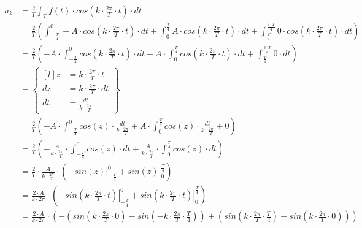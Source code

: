 \begin{equation}
\begin{aligned}
a_k&=\frac{2}{T}\int_{T}f(t) \cdot cos\left( k \cdot \frac{2\pi}{T} \cdot t\right) \cdot dt\\
&=\frac{2}{T}\left(\int_{-\frac{T}{4}}^{0} -A \cdot cos\left( k \cdot \frac{2\pi}{T} \cdot t\right) \cdot dt 
+ \int_{0}^{\frac{T}{4}} A \cdot cos\left( k \cdot \frac{2\pi}{T} \cdot t\right) \cdot dt
+ \int_{\frac{T}{4}}^{\frac{3\cdot T}{4}} 0 \cdot cos\left( k \cdot \frac{2\pi}{T} \cdot t\right) \cdot dt \right)\\
&=\frac{2}{T}\left(-A \cdot \int_{-\frac{T}{4}}^{0} cos\left( k \cdot \frac{2\pi}{T} \cdot t\right) \cdot dt 
+ A \cdot \int_{0}^{\frac{T}{4}} cos\left( k \cdot \frac{2\pi}{T} \cdot t\right) \cdot dt
+ \int_{\frac{T}{4}}^{\frac{3\cdot T}{4}} 0 \cdot dt \right)\\
&=\begin{Bmatrix*}[l]
z&=k \cdot \frac{2\pi}{T} \cdot t \\
dz&=k \cdot \frac{2\pi}{T} \cdot dt \\
dt&=\frac{dt}{k \cdot \frac{2\pi}{T}}
\end{Bmatrix*} \\
&=\frac{2}{T}\left(-A \cdot \int_{-\frac{T}{4}}^{0} cos\left( z \right) \cdot \frac{dt}{k \cdot \frac{2\pi}{T}} 
+ A \cdot \int_{0}^{\frac{T}{4}} cos\left( z \right) \cdot \frac{dt}{k \cdot \frac{2\pi}{T}}
+ 0 \right)\\
&=\frac{2}{T}\left(-\frac{A}{k \cdot \frac{2\pi}{T}} \cdot \int_{-\frac{T}{4}}^{0} cos\left( z \right) \cdot dt 
+ \frac{A}{k \cdot \frac{2\pi}{T}} \cdot \int_{0}^{\frac{T}{4}} cos\left( z \right) \cdot dt\right)\\
&=\frac{2}{T} \cdot \frac{A}{k \cdot \frac{2\pi}{T}} \cdot \left(- \left. sin\left( z \right) \right|_{-\frac{T}{4}}^{0}
+ \left. sin\left( z \right)\right|_{0}^{\frac{T}{4}} \right)\\
&=\frac{2 \cdot A}{k \cdot 2\pi} \cdot \left(- \left. sin\left( k \cdot \frac{2\pi}{T} \cdot t  \right) \right|_{-\frac{T}{4}}^{0}
+ \left. sin\left( k \cdot \frac{2\pi}{T} \cdot t  \right)\right|_{0}^{\frac{T}{4}} \right)\\
&=\frac{2 \cdot A}{k \cdot 2\pi} \cdot \left(- \left( sin\left( k \cdot \frac{2\pi}{T} \cdot 0  \right) - sin\left( - k \cdot \frac{2\pi}{T} \cdot \frac{T}{4}  \right) \right)
+ \left( sin\left( k \cdot \frac{2\pi}{T} \cdot \frac{T}{4}  \right) - sin\left( k \cdot \frac{2\pi}{T} \cdot 0  \right)\right) \right)\\

\end{aligned}
\end{equation}
